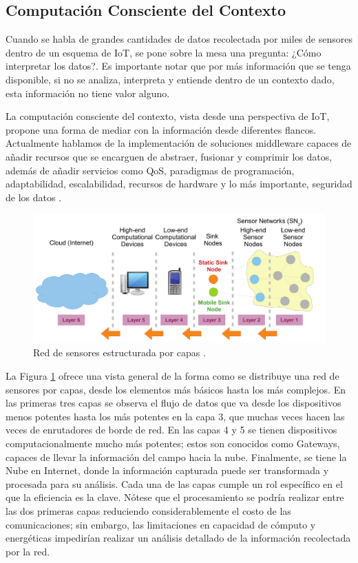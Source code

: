 \subsection{Computación Consciente del Contexto}

Cuando se habla de grandes cantidades de datos recolectada por miles de sensores dentro de un esquema de IoT, se pone sobre la mesa una pregunta: ¿Cómo interpretar los datos?. Es importante notar que por más información que se tenga disponible, si no se analiza, interpreta y entiende dentro de un contexto dado, esta información no tiene valor alguno.

La computación consciente del contexto, vista desde una perspectiva de IoT, propone una forma de mediar con la información desde diferentes flancos. Actualmente hablamos de la implementación de soluciones middleware capaces de añadir recursos que se encarguen de abstraer, fusionar y comprimir los datos, además de añadir servicios como QoS, paradigmas de programación, adaptabilidad, escalabilidad, recursos de hardware y lo más importante, seguridad de los datos \citep{molla2006survey}.

\begin{figure}[!ht]
	\centering
		\includegraphics[scale=0.75]{Figures/Structure_of_a_sensor_network}
	\caption{Red de sensores estructurada por capas \citep{perera2014context}.}
	\label{fig:IoTWSN2Cloud}
\end{figure}

La Figura \ref{fig:IoTWSN2Cloud} ofrece una vista general de la forma como se distribuye una red de sensores por capas, desde los elementos más básicos hasta los más complejos. En las primeras tres capas se observa el flujo de datos que va desde los dispositivos menos potentes hasta los más potentes en la capa 3, que muchas veces hacen las veces de enrutadores de borde de red. En las capas 4 y 5 se tienen dispositivos computacionalmente mucho más potentes; estos son conocidos como Gateways, capaces de llevar la información del campo hacia la nube. Finalmente, se tiene la Nube en Internet, donde la información capturada puede ser transformada y procesada para su análisis. Cada una de las capas cumple un rol específico en el que la eficiencia es la clave\citep{sho2008ttcg}. Nótese que el procesamiento se podría realizar entre las dos primeras capas reduciendo considerablemente el costo de las comunicaciones; sin embargo, las limitaciones en capacidad de cómputo y energéticas impedirían realizar un análisis detallado de la información recolectada por la red.


